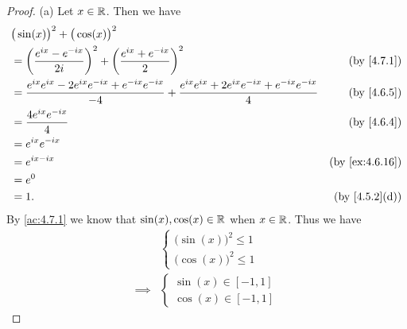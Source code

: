 \begin{proof}{(a)}
  Let \(x \in \mathbb{R}\).
  Then we have
  \begin{align*}
     & \big(\sin(x)\big)^2 + \big(\cos(x)\big)^2                                                                                                                                       \\
     & = \bigg(\frac{e^{i x} - e^{- i x}}{2i}\bigg)^2 + \bigg(\frac{e^{i x} + e^{- i x}}{2}\bigg)^2                                                     & \text{(by \cref{4.7.1})}     \\
     & = \frac{e^{i x} e^{i x} - 2 e^{i x} e^{- i x} + e^{- i x} e^{- i x}}{-4} + \frac{e^{i x} e^{i x} + 2 e^{i x} e^{- i x} + e^{- i x} e^{- i x}}{4} & \text{(by \cref{4.6.5})}     \\
     & = \frac{4 e^{i x} e^{- i x}}{4}                                                                                                                  & \text{(by \cref{4.6.4})}     \\
     & = e^{i x} e^{- i x}                                                                                                                                                             \\
     & = e^{i x - i x}                                                                                                                                  & \text{(by \cref{ex:4.6.16})} \\
     & = e^0                                                                                                                                                                           \\
     & = 1.                                                                                                                                             & \text{(by \cref{4.5.2}(d))}
  \end{align*}
  By \cref{ac:4.7.1} we know that \(\sin(x), \cos(x) \in \mathbb{R}\) when \(x \in \mathbb{R}\).
  Thus we have
  \begin{align*}
             & \begin{cases}
                 \big(\sin(x)\big)^2 \leq 1 \\
                 \big(\cos(x)\big)^2 \leq 1
               \end{cases} \\
    \implies & \begin{cases}
                 \sin(x) \in [-1, 1] \\
                 \cos(x) \in [-1, 1]
               \end{cases}
  \end{align*}
\end{proof}

